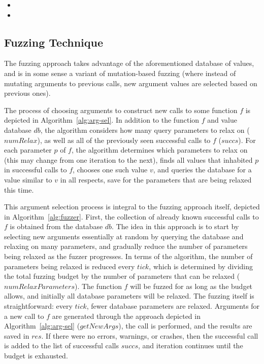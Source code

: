 \documentclass[sigplan,anonymous,review]{acmart}
\begin{document}
\begin{itemize}
    \item {}
    \item {}
\end{itemize}

\subsection{Fuzzing Technique}


The fuzzing approach takes advantage of the aforementioned database of values, and is in some sense a variant of mutation-based fuzzing (where instead of mutating arguments to previous calls, new argument values are selected based on previous ones).

The process of choosing arguments to construct new calls to some function $f$ is depicted in Algorithm~\ref{alg:arg-sel}.
In addition to the function $f$ and value database $db$, the algorithm considers how many query parameters to relax on ($numRelax$), as well as all of the previously seen successful calls to $f$ ($succs$).
For each parameter $p$ of $f$, the algorithm determines which parameters to relax on (this may change from one iteration to the next), finds all values that inhabited $p$ in successful calls to $f$, chooses one such value $v$, and queries the database for a value similar to $v$ in all respects, save for the parameters that are being relaxed this time.

This argument selection process is integral to the fuzzing approach itself, depicted in Algorithm~\ref{alg:fuzzer}.
First, the collection of already known successful calls to $f$ is obtained from the database $db$.
The idea in this approach is to start by selecting new arguments essentially at random by querying the database and relaxing on many parameters, and gradually reduce the number of parameters being relaxed as the fuzzer progresses.
In terms of the algorithm, the number of parameters being relaxed is reduced every $tick$, which is determined by dividing the total fuzzing budget by the number of parameters that can be relaxed ($numRelaxParameters$).
The function $f$ will be fuzzed for as long as the budget allows, and initially all database parameters will be relaxed.
The fuzzing itself is straightforward: every $tick$, fewer database parameters are relaxed.
Arguments for a new call to $f$ are generated through the approach depicted in Algorithm~\ref{alg:arg-sel} ($getNewArgs$), the call is performed, and the results are saved in $res$.
If there were no errors, warnings, or crashes, then the successful call is added to the list of successful calls $succs$, and iteration continues until the budget is exhausted.
\end{document}
